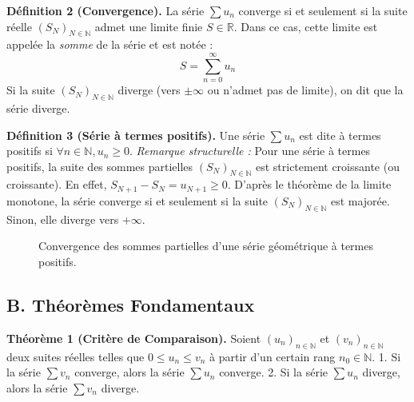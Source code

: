 \documentclass[12pt, a4paper]{article}
\begin{document}
\textbf{Définition 2 (Convergence).} La série $\sum u_n$ converge si et seulement si la suite réelle $(S_N)_{N \in \mathbb{N}}$ admet une limite finie $S \in \mathbb{R}$. Dans ce cas, cette limite est appelée la \textit{somme} de la série et est notée :
$$S = \sum_{n=0}^\infty u_n$$
Si la suite $(S_N)_{N \in \mathbb{N}}$ diverge (vers $\pm\infty$ ou n'admet pas de limite), on dit que la série diverge.

\textbf{Définition 3 (Série à termes positifs).} Une série $\sum u_n$ est dite à termes positifs si $\forall n \in \mathbb{N}, u_n \ge 0$.
\textit{Remarque structurelle :} Pour une série à termes positifs, la suite des sommes partielles $(S_N)_{N \in \mathbb{N}}$ est strictement croissante (ou croissante). En effet, $S_{N+1} - S_N = u_{N+1} \ge 0$. D'après le théorème de la limite monotone, la série converge si et seulement si la suite $(S_N)_{N \in \mathbb{N}}$ est majorée. Sinon, elle diverge vers $+\infty$.


\begin{figure}[h]
\centering
{}
\caption{Convergence des sommes partielles d'une série géométrique à termes positifs.}
\end{figure}

\subsection{B. Théorèmes Fondamentaux}

\textbf{Théorème 1 (Critère de Comparaison).}
Soient $(u_n)_{n \in \mathbb{N}}$ et $(v_n)_{n \in \mathbb{N}}$ deux suites réelles telles que $0 \le u_n \le v_n$ à partir d'un certain rang $n_0 \in \mathbb{N}$.
1. Si la série $\sum v_n$ converge, alors la série $\sum u_n$ converge.
2. Si la série $\sum u_n$ diverge, alors la série $\sum v_n$ diverge.
\end{document}
